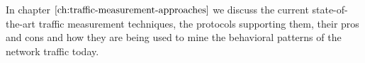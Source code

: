
\vspace{50pt}

In chapter $\ref{ch:traffic-measurement-approaches}$ we discuss the current state-of-the-art traffic measurement techniques, the protocols supporting them, their pros and cons and how they are being used to mine the behavioral patterns of the network traffic today. 


